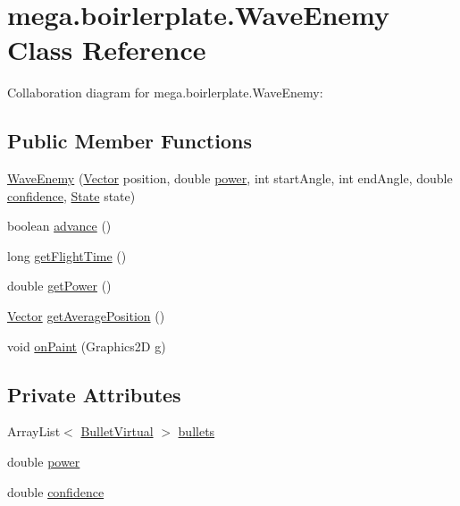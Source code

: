 \hypertarget{classmega_1_1boirlerplate_1_1_wave_enemy}{}\section{mega.\+boirlerplate.\+Wave\+Enemy Class Reference}
\label{classmega_1_1boirlerplate_1_1_wave_enemy}


Collaboration diagram for mega.\+boirlerplate.\+Wave\+Enemy\+:
\subsection*{Public Member Functions}
\begin{DoxyCompactItemize}
\item 
\hyperlink{classmega_1_1boirlerplate_1_1_wave_enemy_a63877837a306a5c22aed83990ef1e5ca}{Wave\+Enemy} (\hyperlink{classmega_1_1boirlerplate_1_1_vector}{Vector} position, double \hyperlink{classmega_1_1boirlerplate_1_1_wave_enemy_a64bdfd045bdda668cebc13d1c53c8efc}{power}, int start\+Angle, int end\+Angle, double \hyperlink{classmega_1_1boirlerplate_1_1_wave_enemy_a40ee79e9eb970f417776521d89a64c82}{confidence}, \hyperlink{classmega_1_1boirlerplate_1_1_state}{State} state)
\item 
boolean \hyperlink{classmega_1_1boirlerplate_1_1_wave_enemy_a049cfed9f952e92a40ca1676312dcf71}{advance} ()
\item 
long \hyperlink{classmega_1_1boirlerplate_1_1_wave_enemy_ae77d428fc69cc10d79e94cca3f8f1eba}{get\+Flight\+Time} ()
\item 
double \hyperlink{classmega_1_1boirlerplate_1_1_wave_enemy_a8100fd097abd774c5a0690e5896629ba}{get\+Power} ()
\item 
\hyperlink{classmega_1_1boirlerplate_1_1_vector}{Vector} \hyperlink{classmega_1_1boirlerplate_1_1_wave_enemy_a81411d993e5045444806b27339a87286}{get\+Average\+Position} ()
\item 
void \hyperlink{classmega_1_1boirlerplate_1_1_wave_enemy_ab9c8931b661bfa995f124272462537a5}{on\+Paint} (Graphics2D g)
\end{DoxyCompactItemize}
\subsection*{Private Attributes}
\begin{DoxyCompactItemize}
\item 
Array\+List$<$ \hyperlink{classmega_1_1boirlerplate_1_1_bullet_virtual}{Bullet\+Virtual} $>$ \hyperlink{classmega_1_1boirlerplate_1_1_wave_enemy_a982e59e80347fce37d93c286dd44b6bf}{bullets}
\item 
double \hyperlink{classmega_1_1boirlerplate_1_1_wave_enemy_a64bdfd045bdda668cebc13d1c53c8efc}{power}
\item 
double \hyperlink{classmega_1_1boirlerplate_1_1_wave_enemy_a40ee79e9eb970f417776521d89a64c82}{confidence}
\end{DoxyCompactItemize}


